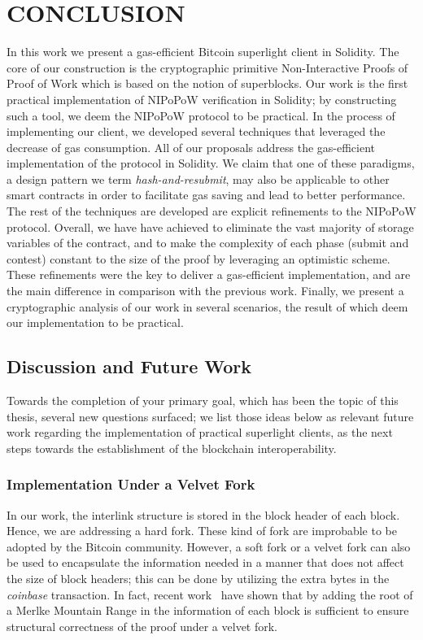 \chapter{CONCLUSION} 

In this work we present a gas-efficient Bitcoin superlight client in Solidity.
The core of our construction is the cryptographic primitive Non-Interactive
Proofs of Proof of Work which is based on the notion of superblocks. Our work
is the first practical implementation of NIPoPoW verification in Solidity; by
constructing such a tool, we deem the NIPoPoW protocol to be practical. In the
process of implementing our client, we developed several techniques that
leveraged the decrease of gas consumption. All of our proposals address the
gas-efficient implementation of the protocol in Solidity. We claim that one of
these paradigms, a design pattern we term \emph{hash-and-resubmit}, may also be
applicable to other smart contracts in order to facilitate gas saving and lead
to better performance. The rest of the techniques are developed are explicit
refinements to the NIPoPoW protocol. Overall, we have have achieved to
eliminate the vast majority of storage variables of the contract, and to make
the complexity of each phase (submit and contest) constant to the size of the
proof by leveraging an optimistic scheme. These refinements were the key to
deliver a gas-efficient implementation, and are the main difference in
comparison with the previous work. Finally, we present a cryptographic analysis
of our work in several scenarios, the result of which deem our
implementation to be practical.

\section{Discussion and Future Work}

Towards the completion of your primary goal, which has been the topic of this
thesis, several new questions surfaced; we list those ideas below as relevant
future work regarding the implementation of practical superlight clients, as
the next steps towards the establishment of the blockchain interoperability.

\subsection{Implementation Under a Velvet Fork}

In our work, the interlink structure is stored in the block header of each
block. Hence, we are addressing a hard fork. These kind of fork are improbable
to be adopted by the Bitcoin community. However, a soft fork or a velvet fork
can also be used to encapsulate the information needed in a manner that does
not affect the size of block headers; this can be done by utilizing the extra
bytes in the \emph{coinbase} transaction. In fact, recent
work~\cite{velvet-nipopows} have shown that by adding the root of a Merlke
Mountain Range in the information of each block is sufficient to ensure
structural correctness of the proof under a velvet fork.


